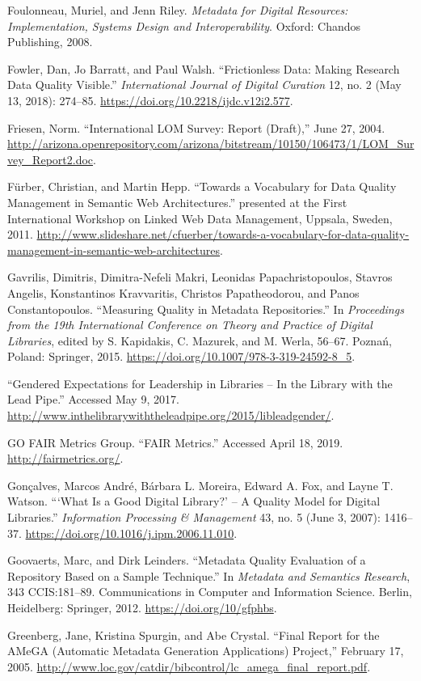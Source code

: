 Foulonneau, Muriel, and Jenn Riley. \emph{Metadata for Digital Resources: Implementation, Systems Design and Interoperability}. Oxford: Chandos Publishing, 2008.

Fowler, Dan, Jo Barratt, and Paul Walsh. “Frictionless Data: Making Research Data Quality Visible.” \emph{International Journal of Digital Curation} 12, no. 2 (May 13, 2018): 274–85. \url{https://doi.org/10.2218/ijdc.v12i2.577}.

Friesen, Norm. “International LOM Survey: Report (Draft),” June 27, 2004. \url{http://arizona.openrepository.com/arizona/bitstream/10150/106473/1/LOM_Survey_Report2.doc}.

Fürber, Christian, and Martin Hepp. “Towards a Vocabulary for Data Quality Management in Semantic Web Architectures.” presented at the First International Workshop on Linked Web Data Management, Uppsala, Sweden, 2011. \url{http://www.slideshare.net/cfuerber/towards-a-vocabulary-for-data-quality-management-in-semantic-web-architectures}.

Gavrilis, Dimitris, Dimitra-Nefeli Makri, Leonidas Papachristopoulos, Stavros Angelis, Konstantinos Kravvaritis, Christos Papatheodorou, and Panos Constantopoulos. “Measuring Quality in Metadata Repositories.” In \emph{Proceedings from the 19th International Conference on Theory and Practice of Digital Libraries}, edited by S. Kapidakis, C. Mazurek, and M. Werla, 56–67. Poznań, Poland: Springer, 2015. \url{https://doi.org/10.1007/978-3-319-24592-8_5}.

“Gendered Expectations for Leadership in Libraries – In the Library with the Lead Pipe.” Accessed May 9, 2017. \url{http://www.inthelibrarywiththeleadpipe.org/2015/libleadgender/}.

GO FAIR Metrics Group. “FAIR Metrics.” Accessed April 18, 2019. \url{http://fairmetrics.org/}.

Gonçalves, Marcos André, Bárbara L. Moreira, Edward A. Fox, and Layne T. Watson. “‘What Is a Good Digital Library?’ – A Quality Model for Digital Libraries.” \emph{Information Processing \& Management} 43, no. 5 (June 3, 2007): 1416–37. \url{https://doi.org/10.1016/j.ipm.2006.11.010}.

Goovaerts, Marc, and Dirk Leinders. “Metadata Quality Evaluation of a Repository Based on a Sample Technique.” In \emph{Metadata and Semantics Research}, 343 CCIS:181–89. Communications in Computer and Information Science. Berlin, Heidelberg: Springer, 2012. \url{https://doi.org/10/gfphbs}.

Greenberg, Jane, Kristina Spurgin, and Abe Crystal. “Final Report for the AMeGA (Automatic Metadata Generation Applications) Project,” February 17, 2005. \url{http://www.loc.gov/catdir/bibcontrol/lc_amega_final_report.pdf}.

